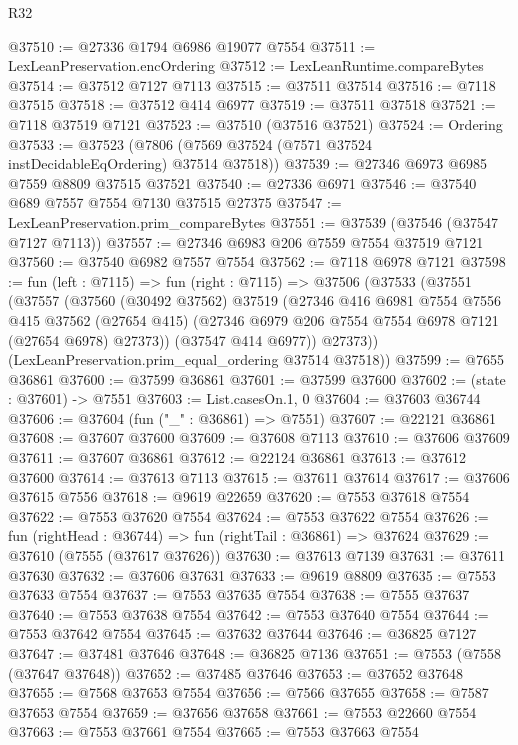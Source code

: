 \begin{lexlean}{R32}
\begin{coremodule}
@37510 := @27336 @1794 @6986 @19077 @7554
@37511 := LexLeanPreservation.encOrdering
@37512 := LexLeanRuntime.compareBytes
@37514 := @37512 @7127 @7113
@37515 := @37511 @37514
@37516 := @7118 @37515
@37518 := @37512 @414 @6977
@37519 := @37511 @37518
@37521 := @7118 @37519 @7121
@37523 := @37510 (@37516 @37521)
@37524 := Ordering
@37533 := @37523 (@7806 (@7569 @37524 (@7571 @37524 instDecidableEqOrdering) @37514 @37518))
@37539 := @27346 @6973 @6985 @7559 @8809 @37515 @37521
@37540 := @27336 @6971
@37546 := @37540 @689 @7557 @7554 @7130 @37515 @27375
@37547 := LexLeanPreservation.prim_compareBytes
@37551 := @37539 (@37546 (@37547 @7127 @7113))
@37557 := @27346 @6983 @206 @7559 @7554 @37519 @7121
@37560 := @37540 @6982 @7557 @7554
@37562 := @7118 @6978 @7121
@37598 := fun (left : @7115) =>
  fun (right : @7115) =>
  @37506
    (@37533
      (@37551
        (@37557
          (@37560
            (@30492 @37562)
            @37519
            (@27346
              @416
              @6981
              @7554
              @7556
              @415
              @37562
              (@27654 @415)
              (@27346 @6979 @206 @7554 @7554 @6978 @7121 (@27654 @6978) @27373))
            (@37547 @414 @6977))
          @27373))
      (LexLeanPreservation.prim_equal_ordering @37514 @37518))
@37599 := @7655 @36861
@37600 := @37599 @36861
@37601 := @37599 @37600
@37602 := (state : @37601) -> @7551
@37603 := List.casesOn.{1, 0}
@37604 := @37603 @36744
@37606 := @37604 (fun ("_" : @36861) => @7551)
@37607 := @22121 @36861
@37608 := @37607 @37600
@37609 := @37608 @7113
@37610 := @37606 @37609
@37611 := @37607 @36861
@37612 := @22124 @36861
@37613 := @37612 @37600
@37614 := @37613 @7113
@37615 := @37611 @37614
@37617 := @37606 @37615 @7556
@37618 := @9619 @22659
@37620 := @7553 @37618 @7554
@37622 := @7553 @37620 @7554
@37624 := @7553 @37622 @7554
@37626 := fun (rightHead : @36744) => fun (rightTail : @36861) => @37624
@37629 := @37610 (@7555 (@37617 @37626))
@37630 := @37613 @7139
@37631 := @37611 @37630
@37632 := @37606 @37631
@37633 := @9619 @8809
@37635 := @7553 @37633 @7554
@37637 := @7553 @37635 @7554
@37638 := @7555 @37637
@37640 := @7553 @37638 @7554
@37642 := @7553 @37640 @7554
@37644 := @7553 @37642 @7554
@37645 := @37632 @37644
@37646 := @36825 @7127
@37647 := @37481 @37646
@37648 := @36825 @7136
@37651 := @7553 (@7558 (@37647 @37648))
@37652 := @37485 @37646
@37653 := @37652 @37648
@37655 := @7568 @37653 @7554
@37656 := @7566 @37655
@37658 := @7587 @37653 @7554
@37659 := @37656 @37658
@37661 := @7553 @22660 @7554
@37663 := @7553 @37661 @7554
@37665 := @7553 @37663 @7554

\end{coremodule}
\end{lexlean}
